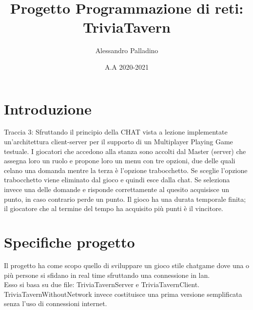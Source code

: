 \documentclass[a4paper,12pt]{report}
\title{Progetto Programmazione di reti: \\ TriviaTavern}
\author{Alessandro Palladino}
\date{A.A 2020-2021}
\begin{document}
\maketitle

\tableofcontents %

\chapter{Introduzione}
    Traccia 3:
    Sfruttando il principio della CHAT vista a lezione implementate
    un’architettura client-server per il supporto di un Multiplayer
    Playing Game testuale.
    I giocatori che accedono alla stanza sono accolti dal Master
    (server) che assegna loro un ruolo e propone loro un menu con
    tre opzioni, due delle quali celano una domanda mentre la
    terza è l’opzione trabocchetto. Se sceglie l’opzione
    trabocchetto viene eliminato dal gioco e quindi esce dalla chat.
    Se seleziona invece una delle domande e risponde
    correttamente al quesito acquisisce un punto, in caso contrario
    perde un punto.
    Il gioco ha una durata temporale finita; il giocatore che al
    termine del tempo ha acquisito più punti è il vincitore.
    
\chapter{Specifiche progetto}
    Il progetto ha come scopo quello di sviluppare un gioco stile chatgame dove una o più persone si sfidano in real time sfruttando una connessione in lan. \\
    Esso si basa su due file: TriviaTavernServer e TriviaTavernClient. \\ 
    TriviaTavernWithoutNetwork invece costituisce una prima versione semplificata senza l'uso di connessioni internet. \\
\end{document}
